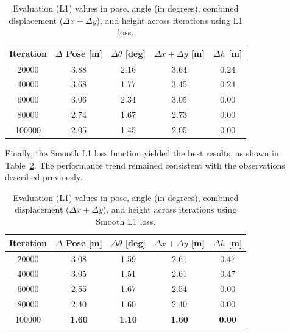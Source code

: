 \begin{table}[H]
    \centering
    \scriptsize
    \renewcommand{\arraystretch}{1.2} 
    \setlength{\tabcolsep}{10pt}
    \begin{tabular}{c c c c c}
        \toprule
        \textbf{Iteration} & \textbf{$\Delta$ Pose [m]} & \textbf{$\Delta \theta$ [deg]} & \textbf{$\Delta x + \Delta y$ [m]} & \textbf{$\Delta h$ [m]} \\
        \midrule
        \num{20000}  & 3.88 & 2.16  & 3.64 & 0.24 \\
        \num{40000}  & 3.68 & 1.77  & 3.45 & 0.24 \\
        \num{60000}  & 3.06 & 2.34  & 3.05 & 0.00 \\
        \num{80000}  & 2.74 & 1.67  & 2.73 & 0.00 \\
        \num{100000} & 2.05 & 1.45  & 2.05 & 0.00 \\
        \bottomrule
    \end{tabular}
    \caption{Evaluation (L1) values in pose, angle (in degrees), combined displacement ($\Delta x + \Delta y$), and height across iterations using L1 loss.}
    \label{tab:pose_variations_deg_l1}
\end{table}

Finally, the Smooth L1 loss function yielded the best results, as shown in Table~\ref{tab:pose_variations_deg_l1s}. The performance trend remained consistent with the observations described previously.

\begin{table}[H]
    \centering
    \scriptsize
    \renewcommand{\arraystretch}{1.2} 
    \setlength{\tabcolsep}{10pt} 
    \begin{tabular}{c c c c c}
        \toprule
        \textbf{Iteration} & \textbf{$\Delta$ Pose [m]} & \textbf{$\Delta \theta$ [deg]} & \textbf{$\Delta x + \Delta y$ [m]} & \textbf{$\Delta h$ [m]} \\
        \midrule
        \num{20000}  & 3.08 & 1.59  & 2.61 & 0.47 \\
        \num{40000}  & 3.05 & 1.51  & 2.61 & 0.47 \\
        \num{60000}  & 2.55 & 1.67  & 2.54 & 0.00 \\
        \num{80000}  & 2.40 & 1.60  & 2.40 & 0.00 \\
        \num{100000} & \textbf{1.60} & \textbf{1.10}  & \textbf{1.60} & \textbf{0.00} \\
        \bottomrule
    \end{tabular}
    \caption{Evaluation (L1) values in pose, angle (in degrees), combined displacement ($\Delta x + \Delta y$), and height across iterations using Smooth L1 loss.}
    \label{tab:pose_variations_deg_l1s}
\end{table}

